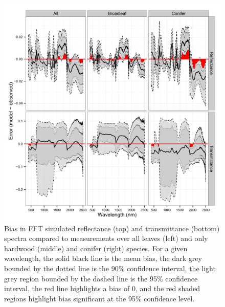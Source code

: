 \begin{figure}
  \centering
  \includegraphics[width=\textwidth]{2_rtm_inversion/figures/spec_validation.png}
  \caption{%
    Bias in FFT simulated reflectance (top) and transmittance (bottom) spectra compared to measurements over all leaves (left) and only hardwood (middle) and conifer (right) species. 
    For a given wavelength,
    the solid black line is the mean bias,
    the dark grey bounded by the dotted line is the 90\% confidence interval,
    the light grey region bounded by the dashed line is the 95\% confidence interval,
    the red line highlights a bias of 0,
    and the red shaded regions highlight bias significant at the 95\% confidence level.
  }\label{fig:pecanrtm-specvalidation}
\end{figure}

